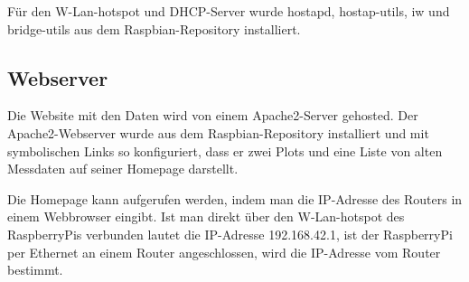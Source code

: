 \documentclass{article}
\begin{document}
Für den W-Lan-hotspot und DHCP-Server wurde hostapd, hostap-utils, iw und bridge-utils aus dem Raspbian-Repository installiert.

\subsection{Webserver}
Die Website mit den Daten wird von einem Apache2-Server gehosted.
Der Apache2-Webserver wurde aus dem Raspbian-Repository installiert und mit symbolischen Links so konfiguriert, dass er zwei Plots und eine Liste von alten Messdaten auf seiner Homepage darstellt.

Die Homepage kann aufgerufen werden, indem man die IP-Adresse des Routers in einem Webbrowser eingibt.
Ist man direkt über den W-Lan-hotspot des RaspberryPis verbunden lautet die IP-Adresse 192.168.42.1, ist der RaspberryPi per Ethernet an einem Router angeschlossen, wird die IP-Adresse vom Router bestimmt.
\end{document}
